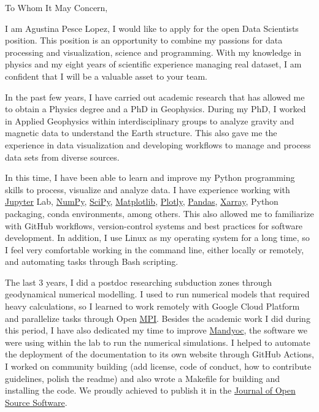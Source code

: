 \documentclass[a4paper]{letter}
\newcommand{\mandyoc}{\href{https://github.com/ggciag/mandyoc}{Mandyoc}}
\newcommand{\xarray}{\href{https://xarray.dev/}{Xarray}}
\newcommand{\matplotlib}{\href{https://matplotlib.org/}{Matplotlib}}
\newcommand{\numpy}{\href{https://numpy.org/}{NumPy}}
\newcommand{\pandas}{\href{https://pandas.pydata.org/}{Pandas}}
\newcommand{\plotly}{\href{https://plotly.com/python/}{Plotly}}
\newcommand{\scipy}{\href{https://scipy.org/}{SciPy}}
\newcommand{\jupyter}{\href{https://jupyter.org/}{Jupyter}}
\newcommand{\position}{Data Scientists}
\begin{document}
    \begin{letter}{}

    \date{\today}

    \opening{\noindent To Whom It May Concern,}

    I am Agustina Pesce Lopez, I would like to apply for the open \position{}
    position.
    This position is an opportunity to combine my passions for data processing
    and visualization, science and programming.
    With my knowledge in physics and my eight years of scientific experience
    managing real dataset, I am confident that I will be a valuable asset to
    your team.

    In the past few years, I have carried out academic research that has
    allowed me to obtain a Physics degree and a PhD in Geophysics.
    During my PhD, I worked in Applied Geophysics within interdisciplinary
    groups to analyze gravity and magnetic data to understand the Earth
    structure.
    This also gave me the experience in data visualization and developing
    workflows to manage and process data sets from diverse sources.

    In this time, I have been able to learn and improve my Python programming
    skills to process, visualize and analyze data.
    I have experience working with \jupyter{} Lab, \numpy{}, \scipy{},
    \matplotlib{}, \plotly{}, \pandas{}, \xarray{}, Python packaging, conda
    environments, among others.
    This also allowed me to familiarize with GitHub workflows, version-control
    systems and best practices for software development.
    In addition, I use Linux as my operating system for a long time, so I feel
    very comfortable working in the command line, either locally or remotely,
    and automating tasks through Bash scripting.

    The last 3 years, I did a postdoc researching subduction zones through
    geodynamical numerical modelling.
    I used to run numerical models that required heavy calculations, so I
    learned to work remotely with Google Cloud Platform and parallelize
    tasks through Open \href{https://www.open-mpi.org/}{MPI}.
    Besides the academic work I did during this period, I have also dedicated
    my time to improve \mandyoc{}, the software we were using within the lab to
    run the numerical simulations.
    I helped to automate the deployment of the documentation to its own website
    through GitHub Actions, I worked on community building (add license, code
    of conduct, how to contribute guidelines, polish the readme) and also
    wrote a Makefile for building and installing the code.
    We proudly achieved to publish it in the
    \href{https://joss.theoj.org/papers/10.21105/joss.04070}{Journal of Open
    Source Software}.


\end{letter}
\end{document}
